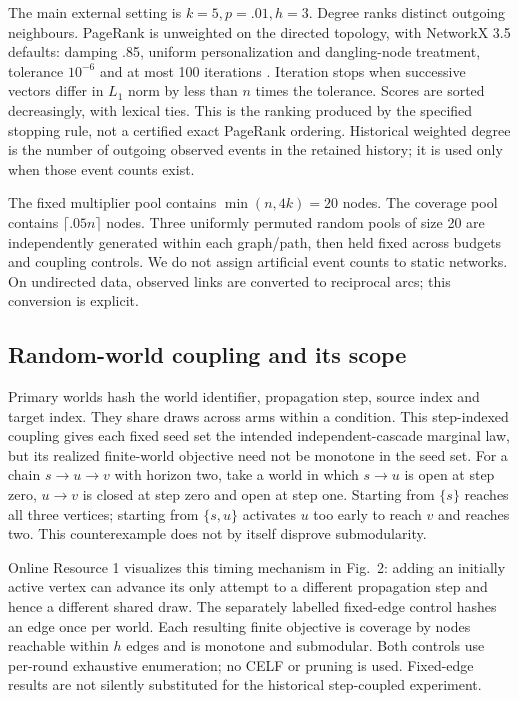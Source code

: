 \documentclass[smallextended]{svjour3}
\begin{document}
The main external setting is $k=5,p=.01,h=3$. Degree ranks distinct outgoing neighbours. PageRank is unweighted on the directed topology, with NetworkX 3.5 defaults: damping .85, uniform personalization and dangling-node treatment, tolerance $10^{-6}$ and at most 100 iterations \cite{networkxpr}. Iteration stops when successive vectors differ in $L_1$ norm by less than $n$ times the tolerance. Scores are sorted decreasingly, with lexical ties. This is the ranking produced by the specified stopping rule, not a certified exact PageRank ordering. Historical weighted degree is the number of outgoing observed events in the retained history; it is used only when those event counts exist.

The fixed multiplier pool contains $\min(n,4k)=20$ nodes. The coverage pool contains $\lceil .05n\rceil$ nodes. Three uniformly permuted random pools of size 20 are independently generated within each graph/path, then held fixed across budgets and coupling controls. We do not assign artificial event counts to static networks. On undirected data, observed links are converted to reciprocal arcs; this conversion is explicit.

\subsection{Random-world coupling and its scope}\label{sec:coupling}
Primary worlds hash the world identifier, propagation step, source index and target index. They share draws across arms within a condition. This step-indexed coupling gives each fixed seed set the intended independent-cascade marginal law, but its realized finite-world objective need not be monotone in the seed set. For a chain $s\to u\to v$ with horizon two, take a world in which $s\to u$ is open at step zero, $u\to v$ is closed at step zero and open at step one. Starting from $\{s\}$ reaches all three vertices; starting from $\{s,u\}$ activates $u$ too early to reach $v$ and reaches two. This counterexample does not by itself disprove submodularity.

Online Resource 1 visualizes this timing mechanism in Fig.~2: adding an initially active vertex can advance its only attempt to a different propagation step and hence a different shared draw. The separately labelled fixed-edge control hashes an edge once per world. Each resulting finite objective is coverage by nodes reachable within $h$ edges and is monotone and submodular. Both controls use per-round exhaustive enumeration; no CELF or pruning is used. Fixed-edge results are not silently substituted for the historical step-coupled experiment.
\end{document}
